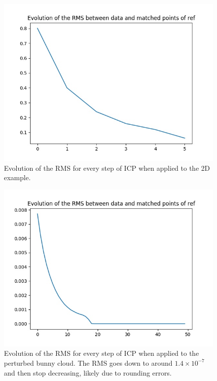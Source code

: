 \documentclass[french]{article}
\begin{document}
\begin{figure}[h]
	\centering
	\includegraphics[width=0.5\linewidth]{q3-2D.jpg}
	\caption{Evolution of the RMS for every step of ICP when applied to the 2D example.}
	\label{fig:q3-2d}
\end{figure}

\begin{figure}[h]
	\centering
	\includegraphics[width=0.5\linewidth]{q3-3D.jpg}
	\caption{Evolution of the RMS for every step of ICP when applied to the perturbed bunny cloud. The RMS goes down to around $1.4\times  10^{-7}$ and then stop decreasing, likely due to rounding errors.}
	\label{fig:q3-3d}
\end{figure}
\end{document}
